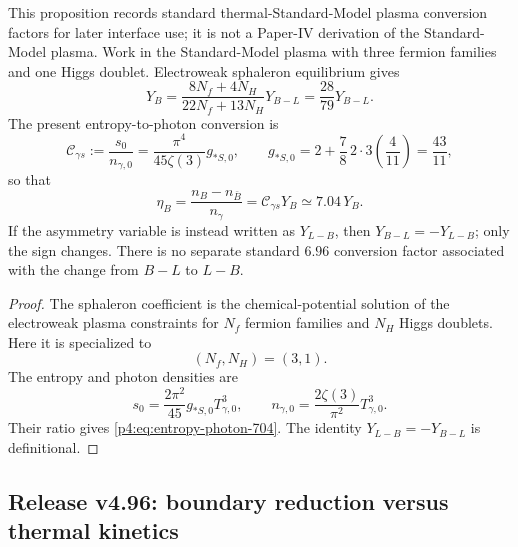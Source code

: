\documentclass[12pt,a4paper]{article}
\begin{document}
\begin{proposition}
\label{p4:prop:sphaleron-and-photon-conversion}
\leavevmode\par\noindent
This proposition records standard thermal-Standard-Model plasma conversion factors for later interface use; it is not a Paper-IV derivation of the Standard-Model plasma.  Work in the Standard-Model plasma with three fermion families and one Higgs doublet.  Electroweak sphaleron equilibrium gives
\begin{equation}
\label{p4:eq:sphaleron-28-79}
Y_B
=
\frac{8N_f+4N_H}{22N_f+13N_H}Y_{B-L}
=
\frac{28}{79}Y_{B-L}.
\end{equation}
The present entropy-to-photon conversion is
\begin{equation}
\label{p4:eq:entropy-photon-704}
\mathcal C_{\gamma s}
:=
\frac{s_0}{n_{\gamma,0}}
=
\frac{\pi^4}{45\zeta(3)}g_{\ast S,0},
\qquad
g_{\ast S,0}=2+\frac78\,2\cdot3\left(\frac4{11}\right)=\frac{43}{11},
\end{equation}
so that
\begin{equation}
\label{p4:eq:etaB-conversion}
\eta_B
=
\frac{n_B-n_{\bar B}}{n_\gamma}
=
\mathcal C_{\gamma s}Y_B
\simeq 7.04\,Y_B.
\end{equation}
If the asymmetry variable is instead written as \(Y_{L-B}\), then
\(Y_{B-L}=-Y_{L-B}\); only the sign changes.  There is no separate standard
\(6.96\) conversion factor associated with the change from \(B-L\) to \(L-B\).
\end{proposition}


\begin{proof}
The sphaleron coefficient is the chemical-potential solution of the electroweak
plasma constraints for \(N_f\) fermion families and \(N_H\) Higgs doublets.
Here it is specialized to
\[
  (N_f,N_H)=(3,1).
\]
The entropy and photon densities are
\[
  s_0=\frac{2\pi^2}{45}g_{\ast S,0}T_{\gamma,0}^3,
  \qquad
  n_{\gamma,0}=\frac{2\zeta(3)}{\pi^2}T_{\gamma,0}^3 .
\]
Their ratio gives \eqref{p4:eq:entropy-photon-704}.  The identity
\(Y_{L-B}=-Y_{B-L}\) is definitional.
\end{proof}




\subsection{Release v4.96: boundary reduction versus thermal kinetics}
\label{p4:sec:v496-boundary-thermal-interface}
\end{document}
